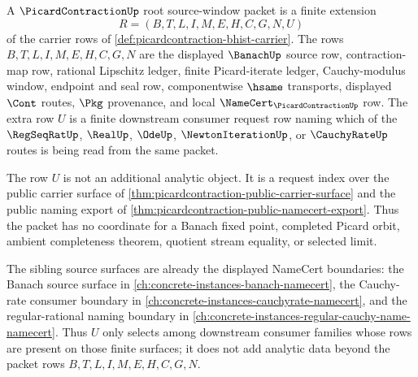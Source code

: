 \begin{definition}
\label{def:picardcontraction-root-source-window-packet}
A $\PicardContractionUp$ root source-window packet is a finite extension
$$
R=(B,T,L,I,M,E,H,C,G,N,U)
$$
of the carrier rows of \autoref{def:picardcontraction-bhist-carrier}. The rows
$B,T,L,I,M,E,H,C,G,N$ are the displayed $\BanachUp$ source row,
contraction-map row, rational Lipschitz ledger, finite Picard-iterate ledger,
Cauchy-modulus window, endpoint and seal row, componentwise $\hsame$
transports, displayed $\Cont$ routes, $\Pkg$ provenance, and local
$\NameCert_{\PicardContractionUp}$ row. The extra row $U$ is a finite
downstream consumer request row naming which of the $\RegSeqRatUp$, $\RealUp$,
$\OdeUp$, $\NewtonIterationUp$, or $\CauchyRateUp$ routes is being read from
the same packet.

The row $U$ is not an additional analytic object. It is a request index over
the public carrier surface of \autoref{thm:picardcontraction-public-carrier-surface}
and the public naming export of \autoref{thm:picardcontraction-public-namecert-export}.
Thus the packet has no coordinate for a Banach fixed point, completed Picard
orbit, ambient completeness theorem, quotient stream equality, or selected
limit.

The sibling source surfaces are already the displayed NameCert boundaries:
the Banach source surface in \autoref{ch:concrete-instances-banach-namecert},
the Cauchy-rate consumer boundary in
\autoref{ch:concrete-instances-cauchyrate-namecert}, and the
regular-rational naming boundary in
\autoref{ch:concrete-instances-regular-cauchy-name-namecert}. Thus $U$ only
selects among downstream consumer families whose rows are present on those
finite surfaces; it does not add analytic data beyond the packet rows
$B,T,L,I,M,E,H,C,G,N$.
\end{definition}

